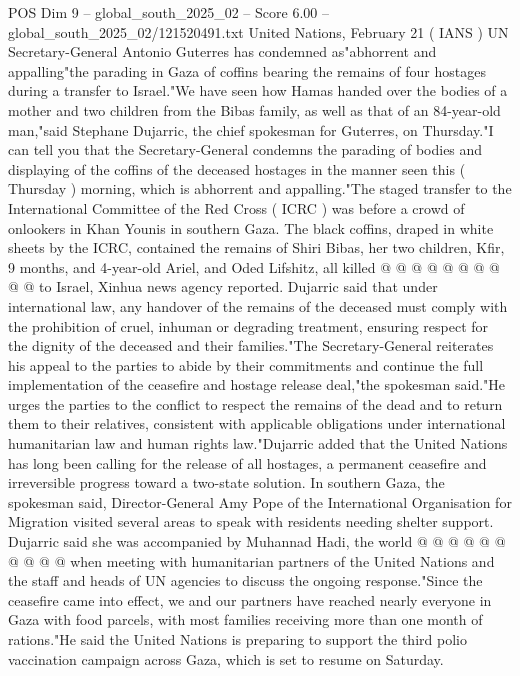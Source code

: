 \begin{textsample}{POS Dim 9 – global\_south\_2025\_02 – Score 6.00 – global\_south\_2025\_02/121520491.txt}  \label{ex:f9_pos_395}
United Nations, February 21 ( IANS ) UN Secretary-General Antonio Guterres has condemned as"abhorrent and appalling"the parading in Gaza of coffins bearing the remains of four hostages during a transfer to Israel."We have seen how Hamas handed over the bodies of a mother and two children from the Bibas family, as well as that of an 84-year-old man,"said Stephane Dujarric, the chief spokesman for Guterres, on Thursday."I can tell you that the Secretary-General condemns the parading of bodies and displaying of the coffins of the deceased hostages in the manner seen this ( Thursday ) morning, which is abhorrent and appalling."The staged transfer to the International Committee of the Red Cross ( ICRC ) was before a crowd of onlookers in Khan Younis in southern Gaza.
The black coffins, draped in white sheets by the ICRC, contained the remains of Shiri Bibas, her two children, Kfir, 9 months, and 4-year-old Ariel, and Oded Lifshitz, all killed @ @ @ @ @ @ @ @ @ @ to Israel, Xinhua news agency reported.
Dujarric said that under international law, any handover of the remains of the deceased must comply with the prohibition of cruel, inhuman or degrading treatment, ensuring respect for the dignity of the deceased and their families."The Secretary-General reiterates his appeal to the parties to abide by their commitments and continue the full implementation of the ceasefire and hostage release deal,"the spokesman said."He urges the parties to the conflict to respect the remains of the dead and to return them to their relatives, consistent with applicable obligations under international humanitarian law and human rights law."Dujarric added that the United Nations has long been calling for the release of all hostages, a permanent ceasefire and irreversible progress toward a two-state solution.
In southern Gaza, the spokesman said, Director-General Amy Pope of the International Organisation for Migration visited several areas to speak with residents needing shelter support.
Dujarric said she was accompanied by Muhannad Hadi, the world @ @ @ @ @ @ @ @ @ @ when meeting with humanitarian partners of the United Nations and the staff and heads of UN agencies to discuss the ongoing response."Since the ceasefire came into effect, we and our partners have reached nearly everyone in Gaza with food parcels, with most families receiving more than one month of rations."He said the United Nations is preparing to support the third polio vaccination campaign across Gaza, which is set to resume on Saturday.

\end{textsample}
